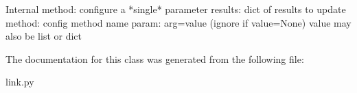 \begin{DoxyVerb}Internal method: configure a *single* parameter
   results: dict of results to update
   method: config method name
   param: arg=value (ignore if value=None)
   value may also be list or dict\end{DoxyVerb}
 

The documentation for this class was generated from the following file\-:\begin{DoxyCompactItemize}
\item 
link.\-py\end{DoxyCompactItemize}
